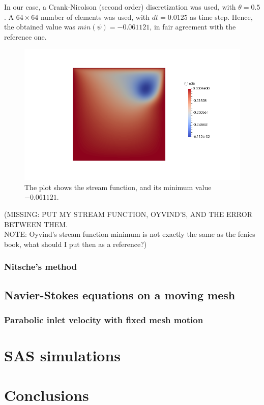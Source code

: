 \documentclass[11pt,a4paper,titlepage]{report}
\begin{document}
In our case, a Crank-Nicolson (second order) discretization was used, with $\theta = 0.5$. A $64 \times 64$ number of elements was used, with $dt = 0.0125$ as time step. Hence, the obtained value was $min(\psi) = -0.061 121$, in fair agreement with the reference one. \\

\vspace{-.3cm}
\begin{figure}[ht]
\centering
\includegraphics[width=\textwidth]{images/mine.png}
\vspace{-1cm}
\caption{The plot shows the stream function, and its minimum value $-0.061 121$.}
\end{figure}

(MISSING: PUT MY STREAM FUNCTION, OYVIND'S, AND THE ERROR BETWEEN THEM. \\
NOTE: Oyvind's stream function minimum is not exactly the same as the fenics book, what should I put then as a reference?)

\subsection{Nitsche's method}


\section{Navier-Stokes equations on a moving mesh}
\subsection{Parabolic inlet velocity with fixed mesh motion}

\chapter{SAS simulations}

\chapter{Conclusions}
\end{document}
